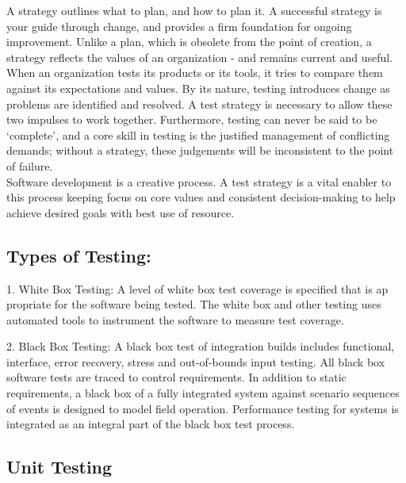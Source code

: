 \documentclass[12pt]{report}
\begin{document}
A strategy outlines what to plan, and how to plan it. A successful strategy is your guide 
through change, and provides a firm foundation for ongoing improvement. Unlike a plan, 
which is obsolete from the point of creation, a strategy reflects the values of an organization 
- and remains current and useful. When an organization tests its products or its tools, it tries 
to compare them against its expectations and values. By its nature, testing introduces change 
as problems are identified and resolved. A test strategy is necessary to allow these two 
impulses to work together. Furthermore, testing can never be said to be ‘complete’, and a 
core skill in testing is the justified management of conflicting demands; without a strategy, 
these judgements will be inconsistent to the point of failure.\\
Software development is a creative process. A test strategy is a vital enabler to this process 
keeping focus on core values and consistent decision-making to help achieve desired goals 
with best use of resource. 

\subsection{ Types of Testing:
}
\justifying
\setlength{\parindent}{4em}
\setlength{\parskip}{0.5em}
\renewcommand{\baselinestretch}{1.5}
\normalsize

\hspace{1.7 cm} 1. White Box Testing: A level of white box test coverage is specified that is ap propriate for 
the software being tested. The white box and other testing uses automated tools to instrument 
the software to measure test coverage.

2. Black Box Testing: A black box test of integration builds includes functional, interface, 
error recovery, stress and out-of-bounds input testing. All black box software tests are traced 
to control requirements. In addition to static requirements, a black box of a fully integrated 
system against scenario sequences of events is designed to model field operation. 
Performance testing for systems is integrated as an integral part of the black box test process.


\subsection{ Unit Testing
}
\justifying
\setlength{\parindent}{4em}
\setlength{\parskip}{0.5em}
\renewcommand{\baselinestretch}{1.5}
\normalsize
\end{document}
